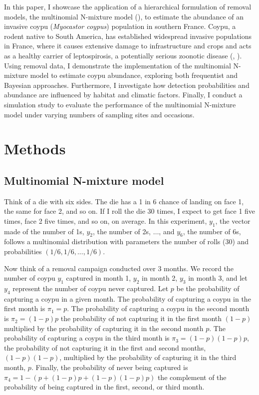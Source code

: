 \documentclass[
  11pt,
  a4paper,
]{article}
\begin{document}
In this paper, I showcase the application of a hierarchical formulation of removal models, the multinomial N-mixture model (), to estimate the abundance of an invasive coypu (\emph{Myocastor coypus}) population in southern France. Coypu, a rodent native to South America, has established widespread invasive populations in France, where it causes extensive damage to infrastructure and crops and acts as a healthy carrier of leptospirosis, a potentially serious zoonotic disease (, ). Using removal data, I demonstrate the implementation of the multinomial N-mixture model to estimate coypu abundance, exploring both frequentist and Bayesian approaches. Furthermore, I investigate how detection probabilities and abundance are influenced by habitat and climatic factors. Finally, I conduct a simulation study to evaluate the performance of the multinomial N-mixture model under varying numbers of sampling sites and occasions.

\section{Methods}\label{methods}

\subsection{Multinomial N-mixture model}\label{multinomial-n-mixture-model}

Think of a die with six sides. The die has a 1 in 6 chance of landing on face 1, the same for face 2, and so on. If I roll the die 30 times, I expect to get face 1 five times, face 2 five times, and so on, on average. In this experiment, \(y_1\), the vector made of the number of 1s, \(y_2\), the number of 2s, \(\ldots\), and \(y_6\), the number of 6s, follows a multinomial distribution with parameters the number of rolls (30) and probabilities \((1/6, 1/6, ..., 1/6)\).

Now think of a removal campaign conducted over 3 months. We record the number of coypu \(y_1\) captured in month 1, \(y_2\) in month 2, \(y_3\) in month 3, and let \(y_4\) represent the number of coypu never captured. Let \(p\) be the probability of capturing a coypu in a given month. The probability of capturing a coypu in the first month is \(\pi_1 = p\). The probability of capturing a coypu in the second month is \(\pi_2 = (1-p)p\) the probability of not capturing it in the first month \((1 - p)\) multiplied by the probability of capturing it in the second month \(p\). The probability of capturing a coypu in the third month is \(\pi_3 = (1-p)(1-p)p\), the probability of not capturing it in the first and second months, \((1 - p)(1 - p)\), multiplied by the probability of capturing it in the third month, \(p\). Finally, the probability of never being captured is \(\pi_4 = 1 - (p + (1-p)p + (1-p)(1-p)p)\) the complement of the probability of being captured in the first, second, or third month.
\end{document}
